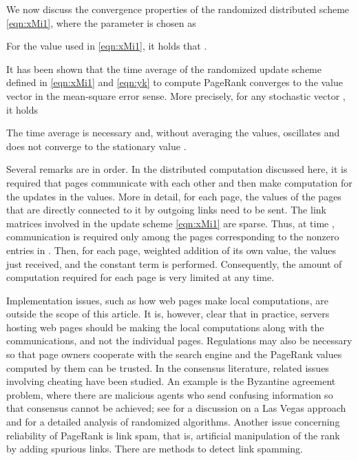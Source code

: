 \documentclass[11pt,draftcls,onecolumn]{IEEEtran}
\begin{document}
We now discuss 
the convergence properties of the randomized distributed scheme \eqref{eqn:xMi1}, 
where the parameter  is chosen as

For the value  used in \eqref{eqn:xMi1},
it holds that . 

It has been shown \cite{IshTem:10} that the time average of the randomized 
update scheme defined in \eqref{eqn:xMi1} and \eqref{eqn:yk} to compute PageRank 
converges to the value vector  in the mean-square error sense. 
More precisely, for any stochastic vector , it holds

The time average is necessary and, without averaging the values, 
 oscillates and does not converge to the stationary value .

Several remarks are in order. 
In the distributed computation discussed here,
it is required that pages communicate with each other and 
then make computation for the updates in the values. 
More in detail, for each page, the values of the 
pages that are directly connected to it by outgoing links need to be
sent. The link matrices  involved in the update scheme \eqref{eqn:xMi1}
are sparse. Thus, at time , communication 
is required only among the pages corresponding to the nonzero entries
in . 
Then, for each page, weighted addition of its own value, the values 
just received, and the constant term  is performed.
Consequently, the amount of computation required 
for each page is very limited at any time.

Implementation issues, such as how web pages 
make local computations, are outside the scope of this article. 
It is, however, clear that in practice, servers hosting web pages should be making the
local computations along with the communications, and not the individual pages.
Regulations may also be necessary so that page owners cooperate with the 
search engine and the PageRank values computed by them 
can be trusted. In the consensus literature, related issues 
involving cheating have been studied. 
An example is the Byzantine agreement problem,
where there are malicious agents who send
confusing information so that 
consensus cannot be achieved; see \cite{TemIsh:07} for a discussion
on a Las Vegas approach and \cite{TemCalDab_book} 
for a detailed analysis of randomized algorithms.
Another issue concerning reliability of PageRank is link spam, that is,
artificial manipulation of the rank by adding spurious links.  
There are methods \cite{LanMey:06,AndBorHop:07}
to detect link spamming.

\vspace{.5cm}
\end{document}
